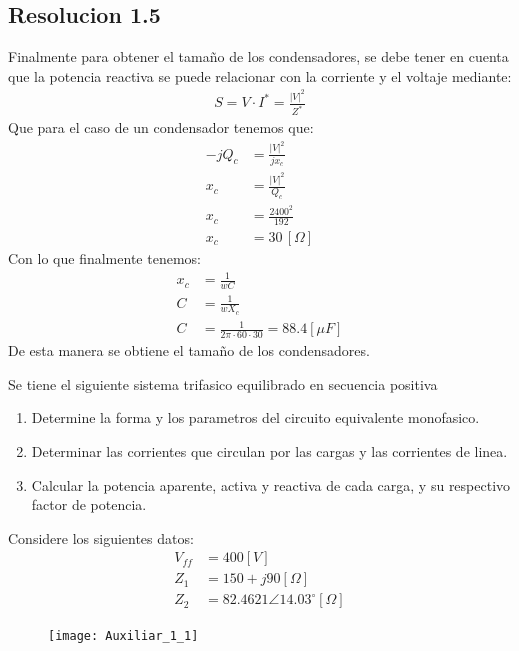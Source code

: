 \documentclass[
  11pt,
  letterpaper,
   addpoints,
   answers
  ]{exam}
\begin{document}
\begin{questions}
\begin{solution}
\subsection*{Resolucion 1.5}
Finalmente para obtener el tamaño de los condensadores, se debe tener en cuenta que la potencia reactiva se puede relacionar con la corriente y el voltaje mediante:
\begin{align}
    S = V \cdot I^{*} = \frac{|V|^{2}}{Z^{*}}
\end{align}
Que para el caso de un condensador tenemos que:
\begin{align}
    -jQ_{c} &= \frac{|V|^{2}}{jx_{c}} \\
    x_{c} &= \frac{|V|^{2}}{Q_{c}} \\
    x_{c} &= \frac{2400^{2}}{192} \\
    x_{c} &= 30\,[\Omega]
\end{align}
Con lo que finalmente tenemos:
\begin{align}
    x_{c} &= \frac{1}{wC} \\
    C &= \frac{1}{wX_{c}}\\
    C &= \frac{1}{2\pi \cdot 60 \cdot 30} = 88.4[\mu F] 
\end{align}
De esta manera se obtiene el tamaño de los condensadores.
    \end{solution}
    \question Se tiene el siguiente sistema trifasico equilibrado en secuencia positiva
    \begin{enumerate}
        \item Determine la forma y los parametros del circuito equivalente monofasico.
        \item Determinar las corrientes que circulan por las cargas y las corrientes de linea.
        \item Calcular la potencia aparente, activa y reactiva de cada carga, y su respectivo factor de potencia.
    \end{enumerate}
    Considere los siguientes datos:
    \begin{align}
        V_{ff} &= 400[V] \\
        Z_{1} &= 150 + j90[\Omega] \\
        Z_{2} &= 82.4621\angle 14.03^{\circ}[\Omega]
    \end{align}
    \begin{figure}[h!]
        \centering
        \texttt{[image: Auxiliar\_1\_1]}
    \end{figure}
\begin{solution}

\end{solution}
\end{questions}
\end{document}
